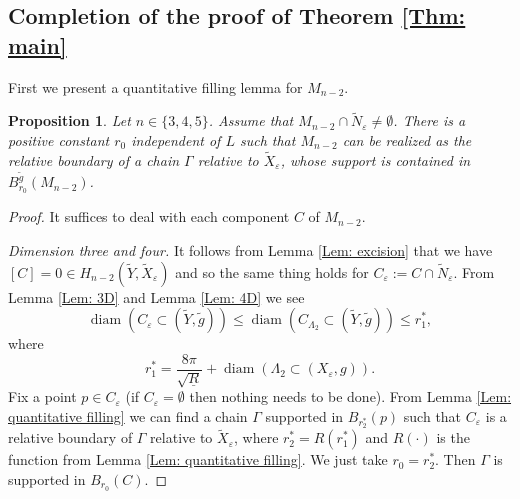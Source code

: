 \documentclass[11pt,letterpaper]{amsart}
\numberwithin{equation}{section}
\newtheorem{proposition}[theorem]{Proposition}
\theoremstyle{definition}
\DeclareMathOperator{\diam}{diam}
\newcommand{\ve}{\varepsilon}
\newcommand{\ti}[1]{\tilde{#1}}
\begin{document}
\subsection{Completion of the proof of Theorem \ref{Thm: main}}
First we present a quantitative filling lemma for $M_{n-2}$.
\begin{proposition}\label{Prop: filling Mn-2}
Let $n \in \{3,4,5\}$. Assume that $M_{n-2}\cap \tilde N_\ve\neq \emptyset$. There is a positive constant $r_0$ independent of $L$ such that $M_{n-2}$ can be realized as the relative boundary of a chain $\Gamma$ relative to $ \ti X_{\ve}$, whose support is contained in $B^{\tilde g}_{r_0}(M_{n-2})$.
\end{proposition}
\begin{proof}
It suffices to deal with each component $C$ of $M_{n-2}$.

\medskip

{\it Dimension three and four.} It follows from Lemma \ref{Lem: excision} that we have $[C]=0\in H_{n-2}(\tilde Y,\tilde X_\ve)$ and so the same thing holds for $C_\ve:=C\cap \tilde N_\ve$. From Lemma \ref{Lem: 3D} and Lemma \ref{Lem: 4D} we see
$$
\diam(C_\ve\subset (\tilde Y,\tilde g))\leq \diam(C_{\Lambda_2}\subset (\tilde Y,\tilde g))\leq r_1^*,
$$
where
$$
r_1^*=\frac{8\pi}{\sqrt{\underline R}}+\diam(\Lambda_2\subset (X_\ve,g)).
$$
Fix a point $p\in C_{\ve}$ (if $C_\ve=\emptyset$ then nothing needs to be done). From Lemma \ref{Lem: quantitative filling} we can find a chain $\Gamma$ supported in $B_{r_2^*}(p)$ such that $C_\ve$ is a relative boundary of $\Gamma$ relative to $\tilde X_\ve$, where $r_2^*=R(r_1^*)$ and $R(\cdot)$ is the function from Lemma \ref{Lem: quantitative filling}. We just take $r_0=r_2^*$. Then $\Gamma$ is supported in $B_{r_0}(C)$.

\medskip


\end{proof}
\end{document}
